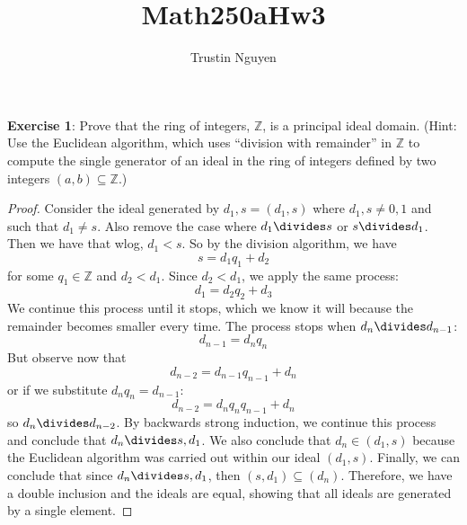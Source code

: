 \documentclass{article}
\title{Math250aHw3}
\author{Trustin Nguyen}
\begin{document}
    \maketitle

\reversemarginpar

\textbf{Exercise 1}: Prove that the ring of integers, $\mathbb{Z}$, is a principal ideal domain. (Hint: Use the Euclidean algorithm, which uses ``division with remainder'' in $\mathbb{Z}$ to compute the single generator of an ideal in the ring of integers defined by two integers $(a, b) \subseteq \mathbb{Z}$.)
    \begin{proof}
        Consider the ideal generated by $d_{1}, s = (d_{1}, s)$ where $d_{1}, s \neq 0, 1$ and such that $d_{1} \neq s$. Also remove the case where $d_{1} \divides s$ or $s \divides d_{1}$. Then we have that wlog, $d_{1} < s$. So by the division algorithm, we have
            \begin{equation*}
                s = d_{1}q_{1} + d_{2}
            \end{equation*}
        for some $q_{1} \in \mathbb{Z}$ and $d_{2} < d_{1}$. Since $d_{2} < d_{1}$, we apply the same process:
            \begin{equation*}
                d_{1} = d_{2}q_{2} + d_{3}
            \end{equation*}
        We continue this process until it stops, which we know it will because the remainder becomes smaller every time. The process stops when $d_{n} \divides d_{n - 1}$:
            \begin{equation*}
                d_{n - 1} = d_{n}q_{n}
            \end{equation*}
        But observe now that
            \begin{equation*}
                d_{n - 2} = d_{n - 1}q_{n - 1} + d_{n}
            \end{equation*}
        or if we substitute $d_{n}q_{n} = d_{n - 1}$:
            \begin{equation*}
                d_{n - 2} = d_{n}q_{n}q_{n - 1} + d_{n}
            \end{equation*}
        so $d_{n} \divides d_{n - 2}$. By backwards strong induction, we continue this process and conclude that $d_{n} \divides s, d_{1}$. We also conclude that $d_{n} \in (d_{1}, s)$ because the Euclidean algorithm was carried out within our ideal $(d_{1}, s)$. Finally, we can conclude that since $d_{n} \divides s, d_{1}$, then $(s, d_{1}) \subseteq (d_{n})$. Therefore, we have a double inclusion and the ideals are equal, showing that all ideals are generated by a single element.
    \end{proof}
\end{document}

